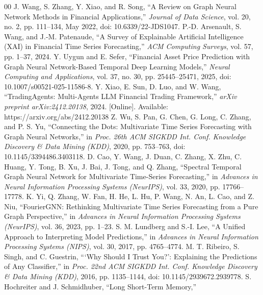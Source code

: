 \documentclass[conference]{IEEEtran}
\begin{document}
\begin{thebibliography}{00}
    J. Wang, S. Zhang, Y. Xiao, and R. Song, ``A Review on Graph Neural
    Network Methods in Financial Applications,''
    \textit{Journal of Data Science}, vol. 20, no. 2, pp. 111--134,
    May 2022, doi: 10.6339/22-JDS1047.
    P.-D. Arsenault, S. Wang, and J.-M. Patenaude, ``A Survey of Explainable
    Artificial Intelligence (XAI) in Financial Time Series Forecasting,''
    \textit{ACM Computing Surveys}, vol. 57, pp. 1--37, 2024.
    Y. Uygun and E. Sefer, ``Financial Asset Price Prediction with Graph
    Neural Network-Based Temporal Deep Learning Models,''
    \textit{Neural Computing and Applications}, vol. 37, no. 30,
    pp. 25445--25471, 2025, doi: 10.1007/s00521-025-11586-8.
    Y. Xiao, E. Sun, D. Luo, and W. Wang, ``TradingAgents: Multi-Agents LLM
    Financial Trading Framework,'' \textit{arXiv preprint arXiv:2412.20138},
    2024. [Online]. Available: https://arxiv.org/abs/2412.20138
    Z. Wu, S. Pan, G. Chen, G. Long, C. Zhang, and P. S. Yu, ``Connecting the
    Dots: Multivariate Time Series Forecasting with Graph Neural Networks,''
    in \textit{Proc. 26th ACM SIGKDD Int. Conf. Knowledge Discovery \&
    Data Mining (KDD)}, 2020, pp. 753--763,
    doi: 10.1145/3394486.3403118.
    D. Cao, Y. Wang, J. Duan, C. Zhang, X. Zhu, C. Huang, Y. Tong,
    B. Xu, J. Bai, J. Tong, and Q. Zhang, ``Spectral Temporal Graph Neural
    Network for Multivariate Time-Series Forecasting,'' in
    \textit{Advances in Neural Information Processing Systems (NeurIPS)},
    vol. 33, 2020, pp. 17766--17778.
    K. Yi, Q. Zhang, W. Fan, H. He, L. Hu, P. Wang, N. An, L. Cao, and
    Z. Niu, ``FourierGNN: Rethinking Multivariate Time Series Forecasting
    from a Pure Graph Perspective,'' in \textit{Advances in Neural
    Information Processing Systems (NeurIPS)}, vol. 36, 2023, pp. 1--23.
    S. M. Lundberg and S.-I. Lee, ``A Unified Approach to Interpreting
    Model Predictions,'' in \textit{Advances in Neural Information
    Processing Systems (NIPS)}, vol. 30, 2017, pp. 4765--4774.
    M. T. Ribeiro, S. Singh, and C. Guestrin, ```Why Should I Trust You?':
    Explaining the Predictions of Any Classifier,'' in
    \textit{Proc. 22nd ACM SIGKDD Int. Conf. Knowledge Discovery \&
    Data Mining (KDD)}, 2016, pp. 1135--1144,
    doi: 10.1145/2939672.2939778.
    S. Hochreiter and J. Schmidhuber, ``Long Short-Term Memory,''

\end{thebibliography}
\end{document}
